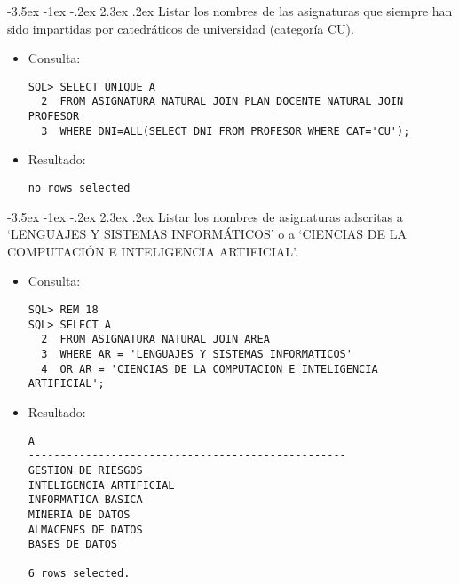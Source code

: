 \documentclass[11pt]{report}
\makeatletter
\renewcommand\chapter{\@startsection{chapter}{0}{\z@}%
    {-3.5ex \@plus -1ex \@minus -.2ex}%
    {2.3ex \@plus.2ex}%
    {\normalfont\Large\bfseries}}
\makeatother
\begin{document}
\chapter{Listar los nombres de las asignaturas que siempre han sido impartidas por catedráticos de universidad (categoría CU).}
\begin{itemize}
  \item Consulta:
  \begin{verbatim}
SQL> SELECT UNIQUE A
  2  FROM ASIGNATURA NATURAL JOIN PLAN_DOCENTE NATURAL JOIN PROFESOR
  3  WHERE DNI=ALL(SELECT DNI FROM PROFESOR WHERE CAT='CU');
  \end{verbatim}
  \item{Resultado:}
  \begin{verbatim}
no rows selected
  \end{verbatim}
\end{itemize}

\chapter{Listar los nombres de asignaturas adscritas a ‘LENGUAJES Y SISTEMAS INFORMÁTICOS’ o a ‘CIENCIAS DE LA COMPUTACIÓN E INTELIGENCIA ARTIFICIAL’.}
\begin{itemize}
  \item Consulta:
  \begin{verbatim}
SQL> REM 18
SQL> SELECT A
  2  FROM ASIGNATURA NATURAL JOIN AREA
  3  WHERE AR = 'LENGUAJES Y SISTEMAS INFORMATICOS' 
  4  OR AR = 'CIENCIAS DE LA COMPUTACION E INTELIGENCIA ARTIFICIAL';
  \end{verbatim}
  \item{Resultado:}
  \begin{verbatim}
A                                                                               
--------------------------------------------------                              
GESTION DE RIESGOS                                                              
INTELIGENCIA ARTIFICIAL                                                         
INFORMATICA BASICA                                                              
MINERIA DE DATOS                                                                
ALMACENES DE DATOS                                                              
BASES DE DATOS                                                                  

6 rows selected.
  \end{verbatim}
\end{itemize}
\end{document}
